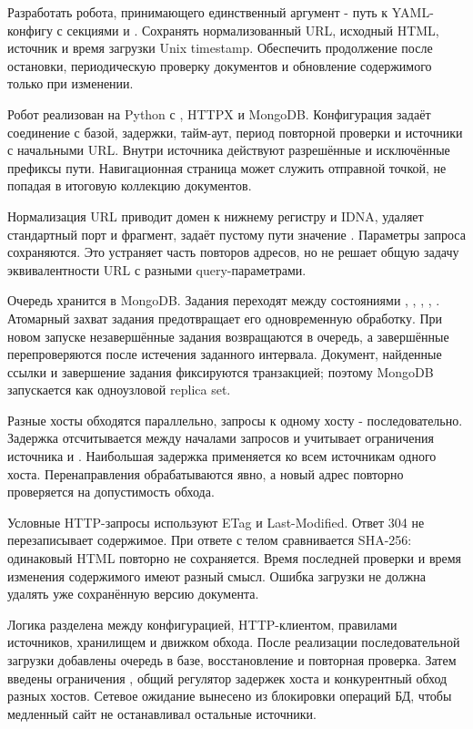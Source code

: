 \task
Разработать робота, принимающего единственный аргумент - путь к YAML-конфигу
с секциями  и . Сохранять нормализованный URL,
исходный HTML, источник и время загрузки Unix timestamp. Обеспечить
продолжение после остановки, периодическую проверку документов и обновление
содержимого только при изменении.

\method
Робот реализован на Python с , HTTPX и MongoDB.
Конфигурация задаёт соединение с базой, задержки, тайм-аут, период
повторной проверки и источники с начальными URL. Внутри источника
действуют разрешённые и исключённые префиксы пути. Навигационная страница
может служить отправной точкой, не попадая в итоговую коллекцию документов.

Нормализация URL приводит домен к нижнему регистру и IDNA, удаляет
стандартный порт и фрагмент, задаёт пустому пути значение \code{/}.
Параметры запроса сохраняются. Это устраняет часть повторов адресов,
но не решает общую задачу эквивалентности URL с разными query-параметрами.

Очередь хранится в MongoDB. Задания переходят между состояниями
, , , ,
. Атомарный захват задания предотвращает его одновременную
обработку. При новом запуске незавершённые задания возвращаются в очередь,
а завершённые перепроверяются после истечения заданного интервала.
Документ, найденные ссылки и завершение задания фиксируются транзакцией;
поэтому MongoDB запускается как одноузловой replica set.

Разные хосты обходятся параллельно, запросы к одному хосту - последовательно.
Задержка отсчитывается между началами запросов и учитывает ограничения
источника и . Наибольшая задержка применяется ко всем
источникам одного хоста. Перенаправления обрабатываются явно, а новый адрес
повторно проверяется на допустимость обхода.

Условные HTTP-запросы используют ETag и Last-Modified. Ответ 304 не
перезаписывает содержимое. При ответе с телом сравнивается SHA-256:
одинаковый HTML повторно не сохраняется. Время последней проверки и время
изменения содержимого имеют разный смысл. Ошибка загрузки не должна удалять
уже сохранённую версию документа.

\journal
Логика разделена между конфигурацией, HTTP-клиентом, правилами источников,
хранилищем и движком обхода. После реализации последовательной загрузки
добавлены очередь в базе, восстановление и повторная проверка. Затем
введены ограничения , общий регулятор задержек хоста
и конкурентный обход разных хостов. Сетевое ожидание вынесено из блокировки
операций БД, чтобы медленный сайт не останавливал остальные источники.


